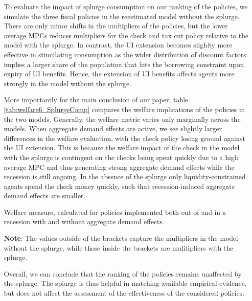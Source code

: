 To evaluate the impact of splurge consumption on our ranking of the policies, we simulate the three fiscal policies in the reestimated model without the splurge.
There are only minor shifts in the multipliers of the policies, but the lower average MPCs reduces multipliers for the check and tax cut policy relative to the model with the splurge.
In contrast, the UI extension becomes slighlty more effective in stimulating consumption as the wider distribution of discount factors implies a larger share of the population that hits the borrowing constraint upon expiry of UI benefits.
Hence, the extension of UI benefits affects agents more strongly in the model without the splurge.

More importantly for the main conclusion of our paper, table \ref{tab:welfare6_SplurgeComp} compares the welfare implications of the policies in the two models.
Generally, the welfare metric varies only marginally across the models.
When aggregate demand effects are active, we see slightly larger differences in the welfare evaluation, with the check policy losing ground against the UI extension.
This is because the welfare impact of the check in the model with the splurge is contingent on the checks being spent quickly due to a high average MPC and thus generating strong aggregate demand effects while the recession is still ongoing.
In the absence of the splurge only liquidity-constrained agents spend the check money quickly, such that recession-induced aggregate demand effects are smaller.


\begin{table}[ht] 
	\center
	
	\caption{Welfare measure, calculated for policies implemented both out of and in a recession with and without aggregate demand effects.}
	\parbox{16cm}{\small \vspace{.15cm} \textbf{Note}: The values outside of the brackets capture the multipliers in the model without the splurge, while those inside the brackets are mulitipliers with the splurge. \normalsize}
	\label{tab:welfare6_SplurgeComp}
\end{table}

Overall, we can conclude that the ranking of the policies remains unaffected by the splurge.
The splurge is thus helpful in matching available empirical evidence, but does not affect the assessment of the effectiveness of the considered policies.











